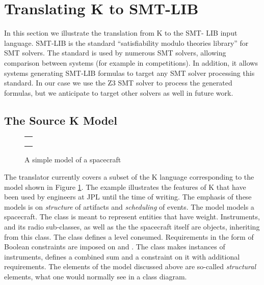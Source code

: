 
\section{Translating K to SMT-LIB}

In this section we illustrate the translation from K to the SMT-
LIB input language. SMT-LIB \cite{smt-lib} is the standard 
``satisfiability modulo theories library'' for SMT solvers. The 
standard is used by numerous SMT solvers, allowing comparison 
between systems (for example in competitions). 
In addition, it allows systems generating SMT-LIB 
formulas to target any SMT solver processing this standard. In our 
case we  use the Z3 SMT solver to process the generated formulas, 
but we anticipate to target other solvers as well in future work.

\subsection{The Source K Model}

\begin{figure}
\centering
\begin{tabular}{c}
\hline \\
 \\ \\
\hline
\end{tabular}
\caption{A simple \Klang{} model of a spacecraft}
\label{fig:spacecraftSmt}
\end{figure}

The translator currently covers a subset of the K language
corresponding to the model shown in Figure 
\ref{fig:spacecraftSmt}. The example illustrates the features
of K that have been used by engineers at JPL until the time of 
writing. The emphasis of these models is on {\em structure}
of artifacts and {\em scheduling} of events. The model models a 
spacecraft. The class  is meant to represent entities 
that have weight. Instruments, and its radio sub-classes, as well
as the the spacecraft itself are objects, inheriting from this 
class. The class  defines a  level 
consumed. Requirements in the form of Boolean constraints are 
imposed on  and . The 
 class makes instances of instruments,
defines a combined sum  and a
constraint on it with additional requirements. The elements of
the model discussed above are so-called {\em structural} elements,
what one would normally see in a class diagram.

